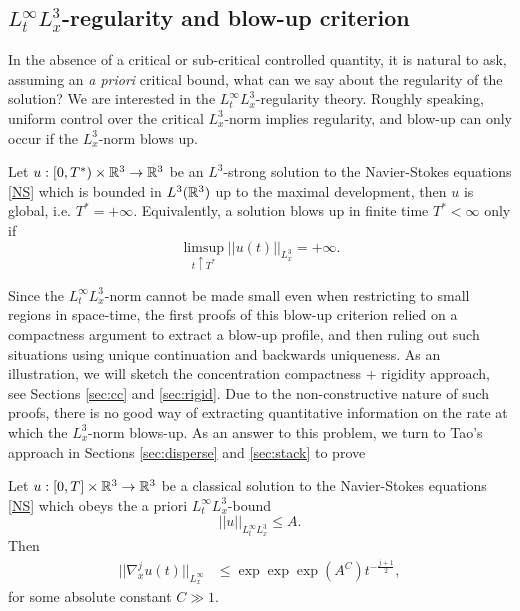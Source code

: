 \subsection{$L^\infty_t L^3_x$-regularity and blow-up criterion}

In the absence of a critical or sub-critical controlled quantity, it is natural to ask, assuming an \textit{a priori} critical bound, what can we say about the regularity of the solution? We are interested in the $L^\infty_t L^3_x$-regularity theory. Roughly speaking, uniform control over the critical $L^3_x$-norm implies regularity, and blow-up can only occur if the $L^3_x$-norm blows up. 

	
\begin{theorem}\label{thm:ESS}
	Let $u: [0, T^*) \times \mathbb R^3 \to \mathbb R^3$ be an $L^3$-strong solution to the Navier-Stokes equations \eqref{NS} which is bounded in $L^3 (\mathbb R^3)$ up to the maximal development, then $u$ is global, i.e. $T^* = + \infty$. Equivalently, a solution blows up in finite time $T^* < \infty$ only if
		\[
			\limsup_{t \uparrow T^*}||u(t)||_{L^3_x} = + \infty.
		\]	
\end{theorem}

Since the $L^\infty_t L^3_x$-norm cannot be made small even when restricting to small regions in space-time, the first proofs of this blow-up criterion relied on a compactness argument to extract a blow-up profile, and then ruling out such situations using unique continuation and backwards uniqueness. As an illustration, we will sketch the concentration compactness + rigidity approach, see Sections \ref{sec:cc} and \ref{sec:rigid}. Due to the non-constructive nature of such proofs, there is no good way of extracting quantitative information on the rate at which the $L^3_x$-norm blows-up. As an answer to this problem, we turn to Tao's approach in Sections \ref{sec:disperse} and \ref{sec:stack} to prove

\begin{theorem}\label{thm:tao1}
	Let $u: [0, T] \times \mathbb R^3 \to \mathbb R^3$ be a classical solution to the Navier-Stokes equations \eqref{NS} which obeys the a priori $L^\infty_t L^3_x$-bound
	\[
		||u||_{L^\infty_t L^3_x} \leq A.
	\]
	Then
		\begin{align}
			||\nabla^j_x u (t)||_{L^\infty_x} 
				&\leq \exp \exp \exp (A^{C}) t^{-\frac{j + 1}{2}}, 
				\label{eq:quantbound}
		\end{align}
	for some absolute constant $C \gg 1$.
\end{theorem}

